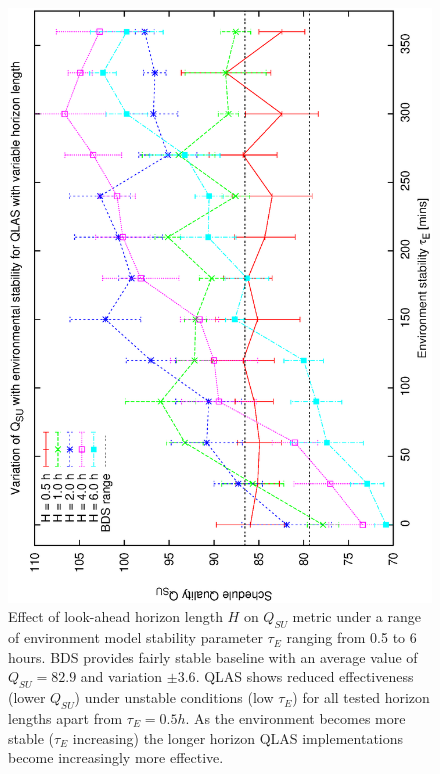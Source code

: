 
\begin{figure}[htp]
\begin{center}
  \includegraphics[scale=0.5, angle=-90]{figures/horiz_env_su2.eps}
  \caption[Effect of look-ahead horizon length $H$ on $Q_{SU}$ under a range of environmental conditions]
  {Effect of look-ahead horizon length $H$ on $Q_{SU}$  metric under a range of environment model stability parameter $\tau_E$ ranging from 0.5 to 6 hours. BDS provides fairly stable baseline with an average value of $Q_{SU}=82.9$ and variation $\pm 3.6$. QLAS shows reduced effectiveness (lower $Q_{SU}$) under unstable conditions (low $\tau_E$) for all tested horizon lengths apart from $\tau_E = 0.5h$. As the environment becomes more stable ($\tau_E$ increasing) the longer horizon QLAS implementations become increasingly more effective.}
\label{fig:hor_denv2}
\end{center}
\end{figure}



